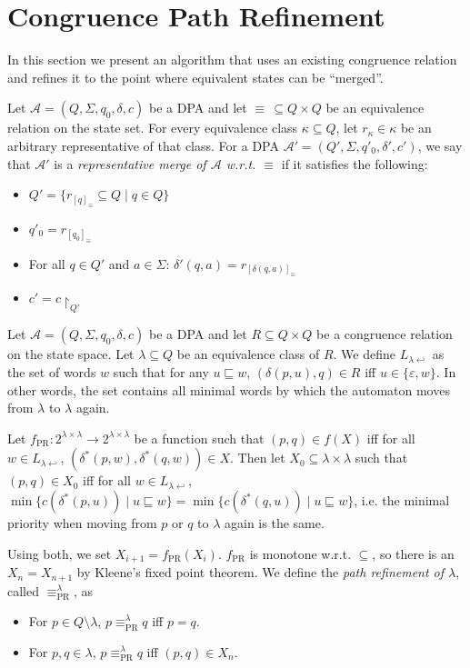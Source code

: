 
\section{Congruence Path Refinement}

In this section we present an algorithm that uses an existing congruence relation and refines it to the point where equivalent states can be \enquote{merged}.

\begin{defn}
	Let $\mathcal{A} = (Q, \Sigma, q_0, \delta, c)$ be a DPA and let $\equiv \,\subseteq Q \times Q$ be an equivalence relation on the state set. For every equivalence class $\kappa \subseteq Q$, let $r_\kappa \in \kappa$ be an arbitrary representative of that class. For a DPA $\mathcal{A}' = (Q', \Sigma, q'_0, \delta', c')$, we say that $\mathcal{A}'$ is a \emph{representative merge of $\mathcal{A}$ w.r.t. $\equiv$} if it satisfies the following:
	\begin{itemize}
		\item $Q' = \{ r_{[q]_\equiv} \subseteq Q \mid q \in Q \}$
		\item $q'_0 = r_{[q_0]_\equiv}$
		\item For all $q \in Q'$ and $a \in \Sigma$: $\delta'(q, a) = r_{[\delta(q, a)]_\equiv}$
		\item $c' = c\upharpoonright_{Q'}$
	\end{itemize}
\end{defn}

\begin{defn}
	Let $\mathcal{A} = (Q, \Sigma, q_0, \delta, c)$ be a DPA and let $R \subseteq Q \times Q$ be a congruence relation on the state space. Let $\lambda \subseteq Q$ be an equivalence class of $R$. We define $L_{\lambda \hookleftarrow}$ as the set of words $w$ such that for any $u \sqsubseteq w$, $(\delta(p, u), q) \in R$ iff $u \in \{\varepsilon, w\}$. In other words, the set contains all minimal words by which the automaton moves from $\lambda$ to $\lambda$ again.
	
	Let $f_\text{PR} : 2^{\lambda \times \lambda} \rightarrow 2^{\lambda \times \lambda}$ be a function such that $(p, q) \in f(X)$  iff for all $w \in L_{\lambda \hookleftarrow}$, $(\delta^*(p, w), \delta^*(q, w)) \in X$.
	Then let $X_0 \subseteq \lambda \times \lambda$ such that $(p, q) \in X_0$ iff for all $w \in L_{\lambda \hookleftarrow}$, $\min \{ c(\delta^*(p, u)) \mid u \sqsubseteq w \} = \min \{ c(\delta^*(q, u)) \mid u \sqsubseteq w \}$, i.e. the minimal priority when moving from $p$ or $q$ to $\lambda$ again is the same.
	
	Using both, we set $X_{i+1} = f_\text{PR}(X_i)$. $f_\text{PR}$ is monotone w.r.t. $\subseteq$, so there is an $X_n = X_{n+1}$ by Kleene's fixed point theorem. We define the \emph{path refinement of $\lambda$}, called $\equiv_\text{PR}^\lambda$, as
	\begin{itemize}
		\item For $p \in Q \setminus \lambda$, $p \equiv_\text{PR}^\lambda q$ iff $p = q$.
		\item For $p, q \in \lambda$, $p \equiv_\text{PR}^\lambda q$ iff $(p, q) \in X_n$.
	\end{itemize}
\end{defn}


